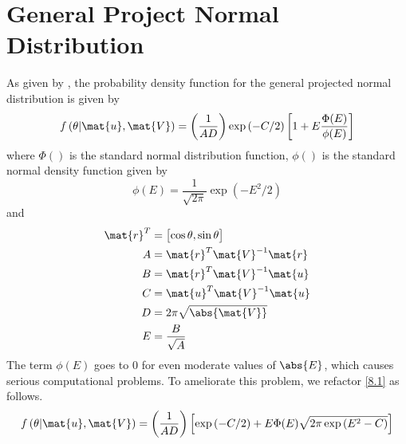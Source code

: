 \documentclass[12pt]{article}
\begin{document}
\section{General Project Normal Distribution}\label{8.1}
As given by \citet[(1)]{Hernandez2017}, the probability density function for the general projected normal distribution is given by
%
\begin{equation}\label{8.1}
    f\left( \theta | \mat{u}, \mat{V} \right)
    = \left( \frac{1}{AD} \right) \exp{(-C/2)} \left[ 1 + E \frac{\Phi(E)}{\phi(E)} \right]
\end{equation}
%
where $\Phi()$ is the standard normal distribution function, $\phi()$ is the standard normal density function given by
%
\begin{equation}\label{8.2}
    \phi(E) = \frac{1}{\sqrt{2 \pi}} \exp{\left(-E^2/2\right)}
\end{equation}
%
and
%
\begin{align}
    \mat{r}^T &= \begin{bmatrix}\cos{\theta}, \sin{\theta} \end{bmatrix} \\
    A &= \mat{r}^T \mat{V}^{-1} \mat{r} \\
    B &= \mat{r}^T \mat{V}^{-1} \mat{u} \\
    C &= \mat{u}^T \mat{V}^{-1} \mat{u} \\
    D &= 2 \pi \sqrt{\abs{\mat{V}}} \\
    E &= \frac{B}{\sqrt{A}}
\end{align}
%
The term $\phi(E)$ goes to $0$ for even moderate values of $\abs{E}$, which causes serious computational problems. To ameliorate this problem, we refactor \eqref{8.1} as follows.
%
\begin{equation}\label{8.1}
    f\left( \theta | \mat{u}, \mat{V} \right)
    = \left( \frac{1}{AD} \right) \left[ \exp{(-C/2)} + E \Phi(E) \sqrt{2\pi \exp{(E^2 - C)}} \right]
\end{equation}


\end{document}
